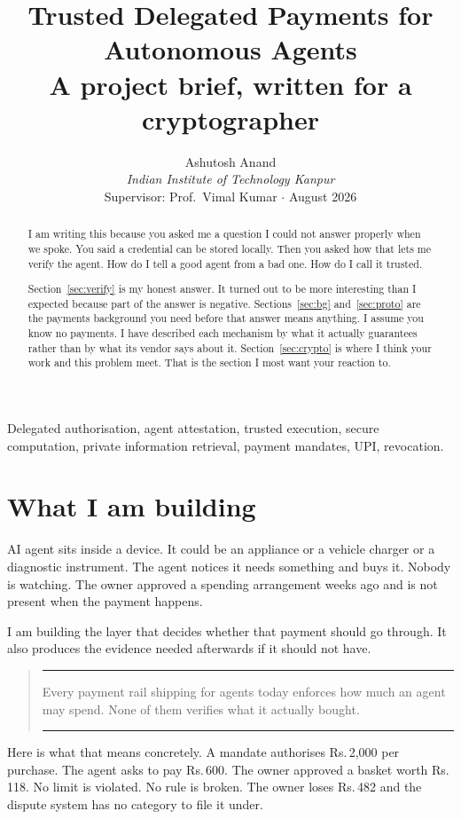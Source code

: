 \documentclass[journal,onecolumn,11pt]{IEEEtran}
\title{Trusted Delegated Payments for Autonomous Agents\\
\large A project brief, written for a cryptographer}
\author{Ashutosh Anand\\
\textit{Indian Institute of Technology Kanpur}\\
Supervisor: Prof.\ Vimal Kumar \quad$\cdot$\quad 21 August 2026}
\newcommand{\rs}{Rs.\,}
\newenvironment{keybox}
  {\begin{quote}\color{accent}\rule{\linewidth}{0.8pt}\vspace{-0.4em}\begin{itshape}}
  {\end{itshape}\vspace{-0.2em}\rule{\linewidth}{0.8pt}\end{quote}}
\begin{document}
\maketitle

\begin{abstract}
\noindent I am writing this because you asked me a question I could not answer properly
when we spoke. You said a credential can be stored locally. Then you asked how that lets
me verify the agent. How do I tell a good agent from a bad one. How do I call it trusted.

Section~\ref{sec:verify} is my honest answer. It turned out to be more interesting than
I expected because part of the answer is negative. Sections~\ref{sec:bg}
and~\ref{sec:proto} are the payments background you need before that answer means
anything. I assume you know no payments. I have described each mechanism by what it
actually guarantees rather than by what its vendor says about it.
Section~\ref{sec:crypto} is where I think your work and this problem meet. That is the
section I most want your reaction to.
\end{abstract}

\begin{IEEEkeywords}
Delegated authorisation, agent attestation, trusted execution, secure computation,
private information retrieval, payment mandates, UPI, revocation.
\end{IEEEkeywords}

\section{What I am building}

 AI agent sits inside a device. It could be an appliance or a vehicle
charger or a diagnostic instrument. The agent notices it needs something and buys it.
Nobody is watching. The owner approved a spending arrangement weeks ago and is not
present when the payment happens.

I am building the layer that decides whether that payment should go through. It also
produces the evidence needed afterwards if it should not have.

\begin{keybox}
Every payment rail shipping for agents today enforces how much an agent may spend. None
of them verifies what it actually bought.
\end{keybox}

Here is what that means concretely. A mandate authorises \rs 2{,}000 per purchase. The
agent asks to pay \rs 600. The owner approved a basket worth \rs 118. No limit is
violated. No rule is broken. The owner loses \rs 482 and the dispute system has no
category to file it under.
\end{document}
